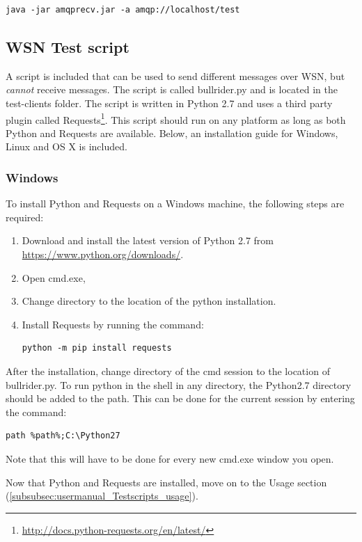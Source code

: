 \begin{verbatim}
java -jar amqprecv.jar -a amqp://localhost/test
\end{verbatim}

\subsection{WSN Test script}
\label{WSN_Test_Script}
A script is included that can be used to send different messages over WSN, but \textit{cannot} receive messages. The script is called bullrider.py and is located in the test-clients folder. The script is written in Python 2.7 and uses a third party plugin called Requests\footnote{\url{http://docs.python-requests.org/en/latest/}}. This script should run on any platform as long as both Python and Requests are available. Below, an installation guide for Windows, Linux and OS X is included.

\subsubsection{Windows}
\label{windows_install_wsn}
To install Python and Requests on a Windows machine, the following steps are required:

\begin{enumerate}
\setlength{\itemsep}{0cm}%
    \item Download and install the latest version of Python 2.7 from \url{https://www.python.org/downloads/}.
    \item Open cmd.exe,
    \item Change directory to the location of the python installation. 
    \item Install Requests by running the command: \begin{verbatim}python -m pip install requests \end{verbatim}
\end{enumerate}

After the installation, change directory of the cmd session to the location of bullrider.py. To run python in the shell in any directory, the Python2.7 directory should be added to the path. This can be done for the current session by entering the command: 
\begin{verbatim}
path %path%;C:\Python27
\end{verbatim}
Note that this will have to be done for every new cmd.exe window you open.

Now that Python and Requests are installed, move on to the Usage section (\ref{subsubsec:usermanual_Testscripts_usage}).

